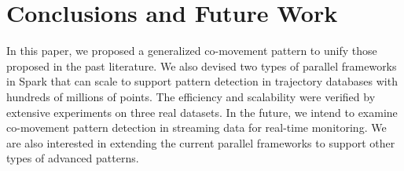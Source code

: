 \vspace{-0.5em}
\section{Conclusions and Future Work}
\label{sec:concl}
In this paper, we proposed a generalized co-movement pattern to unify those proposed in the past literature. We also devised two types of parallel frameworks in Spark that can scale to support pattern detection in trajectory databases with hundreds of millions of points. The efficiency and scalability were verified by extensive experiments on three real datasets. In the future, we intend to examine co-movement pattern detection in streaming data for real-time monitoring. We are also interested in extending the current parallel frameworks to support other types of advanced patterns.